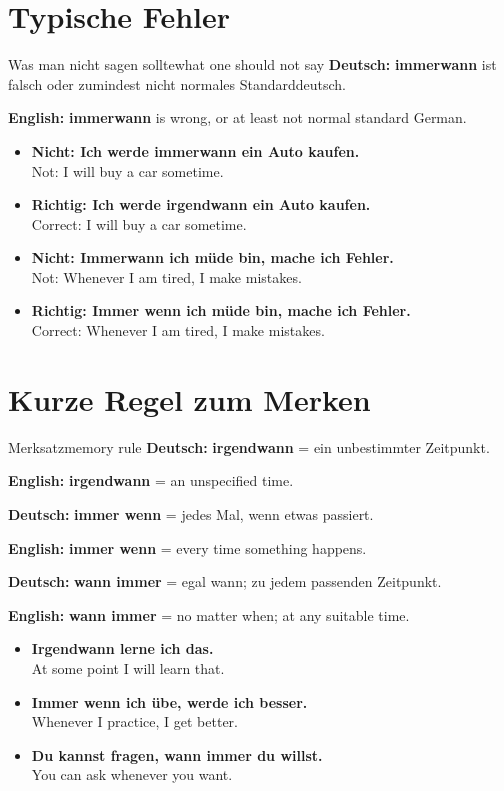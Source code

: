 \documentclass[a4paper,11pt]{article}
\newcommand{\GermanText}[1]{\textbf{Deutsch: }#1\par}
\newcommand{\EnglishText}[1]{{\small\color{SoftGray}\textbf{English: }#1\par}}
\newcommand{\ExampleItem}[2]{\item \textbf{#1}\\{\small\color{SoftGray}#2}}
\begin{document}
\section{Typische Fehler}

\begin{grammarentry}{Was man nicht sagen sollte}{what one should not say}
\GermanText{\textbf{immerwann} ist falsch oder zumindest nicht normales Standarddeutsch.}
\EnglishText{\textbf{immerwann} is wrong, or at least not normal standard German.}

\begin{exbox}
\begin{itemize}
    \ExampleItem{Nicht: Ich werde immerwann ein Auto kaufen.}{Not: I will buy a car sometime.}
    \ExampleItem{Richtig: Ich werde irgendwann ein Auto kaufen.}{Correct: I will buy a car sometime.}
    \ExampleItem{Nicht: Immerwann ich müde bin, mache ich Fehler.}{Not: Whenever I am tired, I make mistakes.}
    \ExampleItem{Richtig: Immer wenn ich müde bin, mache ich Fehler.}{Correct: Whenever I am tired, I make mistakes.}
\end{itemize}
\end{exbox}
\end{grammarentry}

\section{Kurze Regel zum Merken}

\begin{grammarentry}{Merksatz}{memory rule}
\GermanText{\textbf{irgendwann} = ein unbestimmter Zeitpunkt.}
\EnglishText{\textbf{irgendwann} = an unspecified time.}

\GermanText{\textbf{immer wenn} = jedes Mal, wenn etwas passiert.}
\EnglishText{\textbf{immer wenn} = every time something happens.}

\GermanText{\textbf{wann immer} = egal wann; zu jedem passenden Zeitpunkt.}
\EnglishText{\textbf{wann immer} = no matter when; at any suitable time.}

\begin{exbox}
\begin{itemize}
    \ExampleItem{Irgendwann lerne ich das.}{At some point I will learn that.}
    \ExampleItem{Immer wenn ich übe, werde ich besser.}{Whenever I practice, I get better.}
    \ExampleItem{Du kannst fragen, wann immer du willst.}{You can ask whenever you want.}
\end{itemize}
\end{exbox}
\end{grammarentry}
\end{document}
